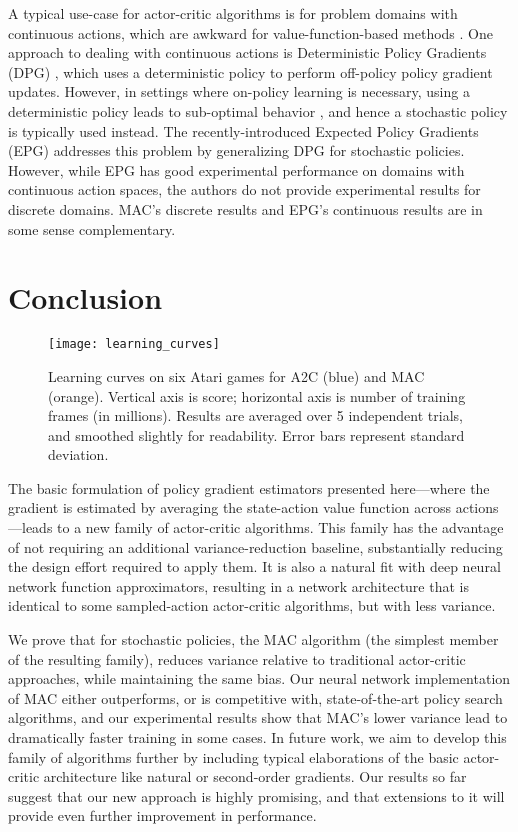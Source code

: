 \documentclass[letterpaper]{article}
\begin{document}
A typical use-case for actor-critic algorithms is for problem domains with continuous actions, which are awkward for
value-function-based methods \cite{sutton1998reinforcement}. One approach to dealing with continuous actions is Deterministic Policy Gradients (DPG) \cite{silver2014deterministic,lillicrap2015continuous}, which uses a deterministic policy to perform off-policy policy gradient updates. However, in settings where on-policy learning is necessary, using a deterministic policy leads to sub-optimal behavior \cite{sutton1998reinforcement}, and hence a stochastic policy is typically used instead. The recently-introduced Expected Policy Gradients (EPG) \cite{ciosek2017expected} addresses this problem by generalizing DPG for stochastic policies. However, while EPG has good experimental performance on domains with continuous action spaces, the authors do not provide experimental results for discrete domains. MAC's discrete results and EPG's continuous results are in some sense complementary.

\section{Conclusion}

\begin{figure*}[t]
\centering
\texttt{[image: learning\_curves]}
\label{fig:atari_learning_curves}
\caption{Learning curves on six Atari games for A2C (blue) and MAC (orange). Vertical axis is score; horizontal axis is number of training frames (in millions). Results are averaged over 5 independent trials, and smoothed slightly for readability. Error bars represent standard deviation.}
\end{figure*}

The basic formulation of policy gradient estimators presented here---where the  gradient is estimated by averaging the state-action value function across actions---leads to a new family of actor-critic algorithms. This family has the advantage of not requiring an additional variance-reduction baseline, substantially reducing the design effort required to apply them. It is also a natural fit with deep neural network function approximators, resulting in a network architecture that is identical to some sampled-action actor-critic algorithms, but with less variance.

We prove that for stochastic policies, the MAC algorithm (the simplest member of the resulting family), reduces variance relative to traditional actor-critic approaches, while maintaining the same bias. Our neural network implementation of MAC either outperforms, or is competitive with, state-of-the-art policy search algorithms, and our experimental results show that MAC's lower variance lead to dramatically faster training in some cases. In future work, we aim to develop this family of algorithms further by including typical elaborations of the basic actor-critic architecture like natural or second-order gradients. Our results so far suggest that our new approach is highly promising, and that extensions to it will provide even further improvement in performance.
\end{document}

